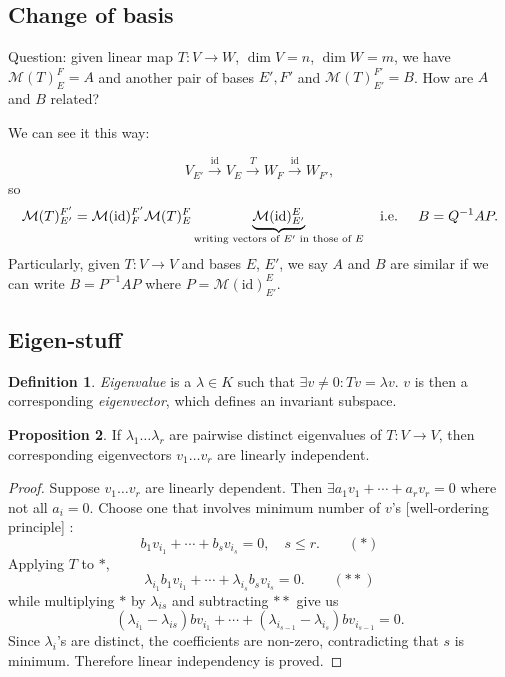 \documentclass[a4paper]{article}
\theoremstyle{definition}
\newtheorem{defn}{Definition}[subsection]
\newtheorem{prop}[defn]{Proposition}
\begin{document}
\subsection{Change of basis}
Question: given linear map $T:V \rightarrow W$, $\dim V=n$, $\dim W =m$, we have $\mathcal M(T)_E^F= A$ and another pair of bases $E',F'$ and $\mathcal M(T)_{E'}^{F'}= B$. How are $A$ and $B$ related?

We can see it this way:

\[
V_{E'} \xrightarrow{\text{id}} V_E \xrightarrow{T} W_F \xrightarrow{\text{id}} W_{F'} ,
\]
so
\[
\mathcal M(T)_{E'}^{F'}=\mathcal M(\text{id})_F^{F'} \mathcal M(T)_E^F \underbrace{\mathcal M (\text{id})_{E'}^E}_{\text{writing vectors of }E' \text{ in those of }E}  \text{\quad i.e. \quad} B = Q^{-1} A P .
\]
Particularly, given $T:V\rightarrow V$ and bases $E$, $E'$, we say $A$ and $B$ are similar if we can write $B = P^{-1} A P$ where $P = \mathcal M (\text{id})_{E'}^E$.

\subsection{Eigen-stuff}

\begin{defn}
	\textit{Eigenvalue} is a $\lambda \in K$ such that $\exists v \neq 0 : Tv=\lambda v$. $v$ is then a corresponding \textit{eigenvector}, which defines an invariant subspace.
\end{defn}

\begin{prop}
	If $\lambda_1 \ldots \lambda_r$ are pairwise distinct eigenvalues of $T:V\rightarrow V$, then corresponding eigenvectors $v_1 \ldots v_r$ are linearly independent.
\end{prop}

\begin{proof}
	Suppose $v_1 \ldots v_r$ are linearly dependent. Then $\exists a_1v_1+\cdots +a_rv_r=0$ where not all $a_i=0$. Choose one that involves minimum number of $v$'s [well-ordering principle] :
\[
b_1v_{i_1}+\cdots+b_sv_{i_s}=0, \quad s \leq r . \qquad (\ast)
\]
Applying $T$ to $\ast$,
\[
\lambda_{i_1} b_1v_{i_1}+\cdots +\lambda_{i_s} b_s v_{i_s} =0 .\qquad (\ast \ast)
\]
while multiplying $\ast$ by $\lambda_{is}$ and subtracting $\ast \ast$ give us
\[
(\lambda_{i_1}-\lambda_{is})bv_{i_1}+\cdots+(\lambda_{i_{s-1}}-\lambda_{i_s}) bv_{i_{s-1}}=0 .
\]
Since $\lambda_i$'s are distinct, the coefficients are non-zero, contradicting that $s$ is minimum. Therefore linear independency is proved.
\end{proof}
\end{document}
